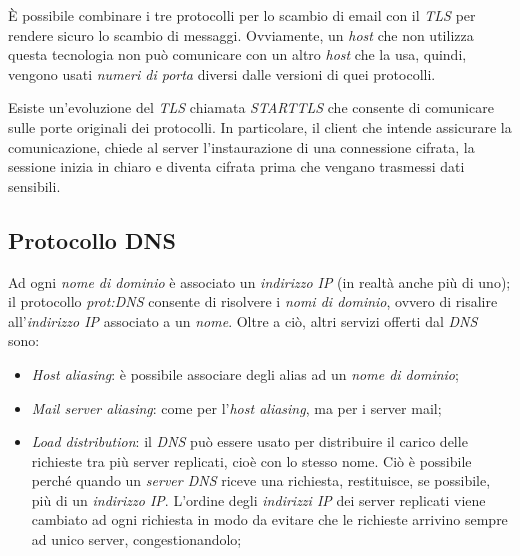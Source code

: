 È possibile combinare i tre protocolli per lo scambio di email con il
\emph{TLS} per rendere sicuro lo scambio di messaggi. Ovviamente, un \emph{host}
che non utilizza questa tecnologia non può comunicare con un altro \emph{host} che
la usa, quindi, vengono usati \emph{numeri di porta} diversi dalle versioni
 di quei protocolli.

\bigskip\noindent
Esiste un'evoluzione del \emph{TLS} chiamata \emph{STARTTLS} che consente
di comunicare sulle porte originali dei protocolli. In particolare, il client
che intende assicurare la comunicazione, chiede al server l'instaurazione di una
connessione cifrata, la sessione inizia in chiaro e diventa cifrata prima che
vengano trasmessi dati sensibili.

\subsection{Protocollo DNS}
Ad ogni \emph{nome di dominio} è associato un \emph{indirizzo IP} (in realtà anche
più di uno); il protocollo \emph{\gls{prot:DNS}} consente di risolvere i \emph{nomi
di dominio}, ovvero di risalire all'\emph{indirizzo IP} associato a un \emph{nome}.
Oltre a ciò, altri servizi offerti dal \emph{DNS} sono:
\begin{itemize}
    \item \emph{Host aliasing}: è possibile associare degli alias ad un \emph{nome
    di dominio};
    \item \emph{Mail server aliasing}: come per l'\emph{host aliasing}, ma per i
    server mail;
    \item \emph{Load distribution}: il \emph{DNS} può essere usato per distribuire
    il carico delle richieste tra più server replicati, cioè con lo stesso nome.
    Ciò è possibile perché quando un \emph{server DNS} riceve una richiesta,
    restituisce, se possibile, più di un \emph{indirizzo IP}. L’ordine degli
    \emph{indirizzi IP} dei server replicati viene cambiato ad ogni richiesta in
    modo da evitare che le richieste arrivino sempre ad unico server, congestionandolo;
\end{itemize}

